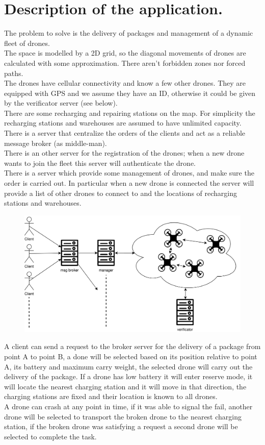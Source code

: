 \documentclass[a4paper, oneside]{memoir}
\begin{document}
\section{Description of the application.}
The problem to solve is the delivery of packages and management of a dynamic fleet of drones.\\
The space is modelled by a 2D grid, so the diagonal movements of drones are calculated with some approximation. There aren't forbidden zones nor forced paths.\\
The drones have cellular connectivity and know a few other drones. They are equipped with GPS and we assume they have an ID, otherwise it could be given by the verificator server (see below).\\
There are some recharging and repairing stations on the map. For simplicity the recharging stations and warehouses are assumed to have unlimited capacity.\\
There is a server that centralize the orders of the clients and act as a reliable message broker (as middle-man).\\
There is an other server for the registration of the drones; when a new drone wants to join the fleet this server will authenticate the drone.\\
There is a server which provide some management of drones, and make sure the order is carried out. In particular when a new drone is connected the server will provide a list of other drones to connect to and the locations of recharging stations and warehouses.\\


\begin{figure}[h!]
	\centering
	\includegraphics[width=\linewidth]{Overview}
\end{figure}

A client can send a request to the broker server for the delivery of a package from point A to point B, a done will be selected based on its position relative to point A, its  battery and maximum carry weight, the selected drone will carry out the delivery of the package.
If a drone has low battery it will enter reserve mode, it will locate the nearest charging station and it will move in that direction, the charging stations are fixed and their location is known to all drones.\\
A drone can crash at any point in time, if it was able to signal the fail, another drone will be selected to transport the broken drone to the nearest charging station, if the broken drone was satisfying a request a second drone will be selected to complete the task.
\end{document}
